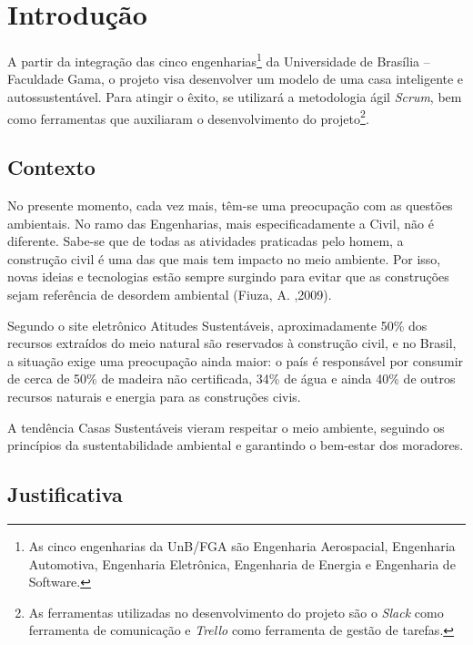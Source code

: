 \chapter[Introdução]{Introdução}

	A partir da integração das cinco engenharias\footnote{As cinco engenharias da UnB/FGA são Engenharia Aerospacial, Engenharia Automotiva, Engenharia Eletrônica, Engenharia de Energia e Engenharia de Software.} da Universidade de Brasília -- Faculdade Gama, o projeto visa desenvolver um modelo de uma casa inteligente e autossustentável. Para atingir o êxito, se utilizará a metodologia ágil \textit{Scrum}, bem como ferramentas que auxiliaram o desenvolvimento do projeto\footnote{As ferramentas utilizadas no desenvolvimento do projeto são o \textit{Slack} como ferramenta de comunicação e \textit{Trello} como ferramenta de gestão de tarefas.}.

\section{Contexto}

	No presente momento, cada vez mais, têm-se uma preocupação com as questões ambientais. No ramo das Engenharias, mais especificadamente a Civil, não é diferente. Sabe-se que de todas as atividades praticadas pelo homem, a construção civil é uma das que mais tem impacto no meio ambiente. Por isso, novas ideias e tecnologias estão sempre surgindo para evitar que as construções sejam referência de desordem ambiental (Fiuza, A. ,2009).

	Segundo o site eletrônico Atitudes Sustentáveis, aproximadamente 50\% dos recursos extraídos do meio natural são reservados à construção civil, e no Brasil, a situação exige uma preocupação ainda maior: o país é responsável por consumir de cerca de 50\% de madeira não certificada, 34\% de água e ainda 40\% de outros recursos naturais e energia para as construções civis.


	A tendência Casas Sustentáveis vieram respeitar o meio ambiente, seguindo os princípios da sustentabilidade ambiental e garantindo o bem-estar dos moradores. 


\section{Justificativa}

